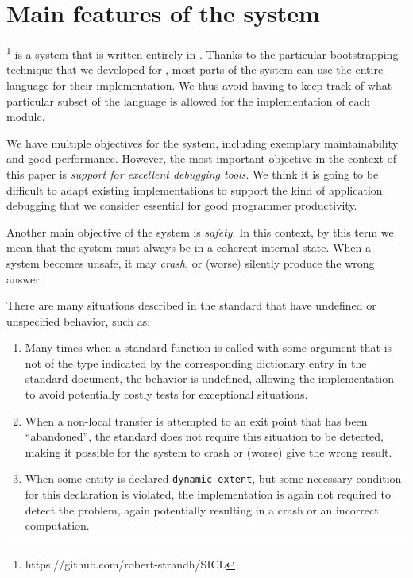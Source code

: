 \section{Main features of the \sicl{} system}
\label{sec-sicl-features}

\sicl{}%
\footnote{https://github.com/robert-strandh/SICL}
is a system that is written entirely in \commonlisp{}.  Thanks
to the particular bootstrapping technique
\cite{durand_irene_2019_2634314} that we developed for \sicl{}, most
parts of the system can use the entire language for their
implementation.  We thus avoid having to keep track of what particular
subset of the language is allowed for the implementation of each
module.

We have multiple objectives for the \sicl{} system, including
exemplary maintainability and good performance.  However, the most
important objective in the context of this paper is \emph{support for
  excellent debugging tools}.  We think it is going to be difficult to
adapt existing \commonlisp{} implementations to support the kind of
application debugging that we consider essential for good programmer
productivity.

Another main objective of the \sicl{} system is \emph{safety}.  In
this context, by this term we mean that the system must always be in a
coherent internal state.  When a system becomes unsafe, it may
\emph{crash}, or (worse) silently produce the wrong answer.

There are many situations described in the \commonlisp{} standard that
have undefined or unspecified behavior, such as:

\begin{enumerate}
\item Many times when a standard function is called with some argument
  that is not of the type indicated by the corresponding dictionary
  entry in the \commonlisp{} standard document, the behavior is
  undefined, allowing the implementation to avoid potentially costly
  tests for exceptional situations.
\item When a non-local transfer is attempted to an exit point that has
  been ``abandoned'', the standard does not require this situation to
  be detected, making it possible for the system to crash or (worse)
  give the wrong result.
\item When some entity is declared \texttt{dynamic-extent}, but some
  necessary condition for this declaration is violated, the
  implementation is again not required to detect the problem, again
  potentially resulting in a crash or an incorrect computation.
\end{enumerate}

